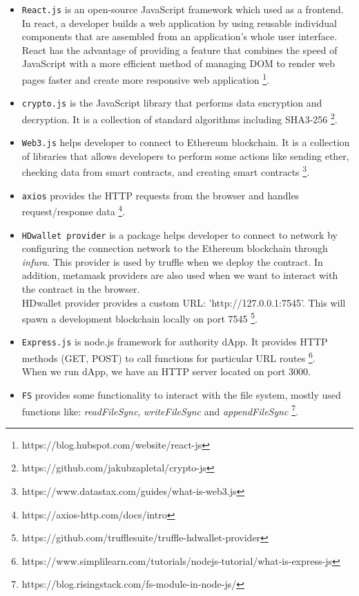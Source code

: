 \begin{itemize}
\item \texttt{React.js} is an open-source JavaScript framework which used as a frontend. In react, a developer builds a web application by using reusable individual components that are assembled from an application's whole user interface.\\
React has the advantage of providing a feature that combines the speed of JavaScript with a more efficient method of managing DOM to render web pages faster and create more responsive web application \footnote{https://blog.hubspot.com/website/react-js}.\\
\item \texttt{crypto.js} is the JavaScript library that performs data encryption and decryption. It is a collection of standard algorithms including SHA3-256 \footnote{{https://github.com/jakubzapletal/crypto-js}}.
\item \texttt{Web3.js} helps developer to connect to Ethereum blockchain. It is a collection of libraries that allows developers to perform some actions like sending ether, checking data from smart contracts, and creating smart contracts \footnote{https://www.datastax.com/guides/what-is-web3.js}.\\
\item \texttt{axios} provides the HTTP requests from the browser and handles request/response data \footnote{https://axios-http.com/docs/intro}. \\
\item \texttt{HDwallet provider} is a package helps developer to connect to network by configuring the connection network to the Ethereum blockchain through \textit{infura}. This provider is used by truffle when we deploy the contract. In addition, metamask providers are also used when we want to interact with the contract in the browser.\\
HDwallet provider provides a custom URL: 'http://127.0.0.1:7545'. This will spawn a development blockchain locally on port 7545 \footnote{https://github.com/trufflesuite/truffle-hdwallet-provider}. \\
\item \texttt{Express.js} is node.js framework for authority dApp. It provides HTTP methods (GET, POST) to call functions for particular URL routes \footnote{https://www.simplilearn.com/tutorials/nodejs-tutorial/what-is-express-js}. \\ 
When we run dApp, we have an HTTP server located on port 3000. \\
\item \texttt{FS} provides some functionality to interact with the file system, mostly used functions like: \textit{readFileSync}, \textit{writeFileSync} and \textit{appendFileSync} \footnote{https://blog.risingstack.com/fs-module-in-node-js/}. \\
\end{itemize}


